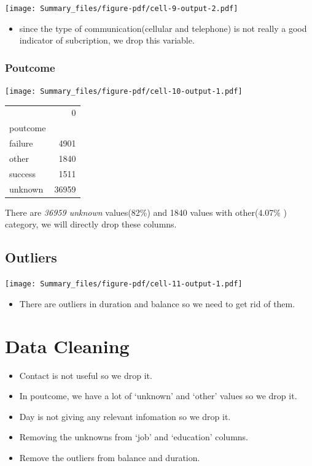 \documentclass[
  letterpaper,
  DIV=11,
  numbers=noendperiod]{scrartcl}
\providecommand{\tightlist}{%
  \setlength{\itemsep}{0pt}\setlength{\parskip}{0pt}}\usepackage{longtable,booktabs,array}
\begin{document}
\texttt{[image: Summary\_files/figure-pdf/cell-9-output-2.pdf]}

\begin{itemize}
\tightlist
\item
  since the type of communication(cellular and telephone) is not really
  a good indicator of subcription, we drop this variable.
\end{itemize}

\hypertarget{poutcome}{%
\subsubsection{Poutcome}\label{poutcome}}

\texttt{[image: Summary\_files/figure-pdf/cell-10-output-1.pdf]}

\begin{tabular}{lr}
\toprule
{} &      0 \\
poutcome &        \\
\midrule
failure  &   4901 \\
other    &   1840 \\
success  &   1511 \\
unknown  &  36959 \\
\bottomrule
\end{tabular}

There are \emph{36959 unknown} values(82\%) and 1840 values with
other(4.07\% ) category, we will directly drop these columns.

\hypertarget{outliers}{%
\subsection{Outliers}\label{outliers}}

\texttt{[image: Summary\_files/figure-pdf/cell-11-output-1.pdf]}

\begin{itemize}
\tightlist
\item
  There are outliers in duration and balance so we need to get rid of
  them.
\end{itemize}

\hypertarget{data-cleaning}{%
\section{Data Cleaning}\label{data-cleaning}}

\begin{itemize}
\tightlist
\item
  Contact is not useful so we drop it.
\item
  In poutcome, we have a lot of `unknown' and `other' values so we drop
  it.\\
\item
  Day is not giving any relevant infomation so we drop it.
\item
  Removing the unknowns from `job' and `education' columns.
\item
  Remove the outliers from balance and duration.
\end{itemize}
\end{document}
